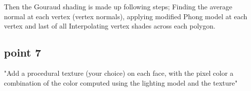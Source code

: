 \documentclass[12pt,a4paper]{article}
\begin{document}
Then the Gouraud shading is made up following steps; Finding the average normal at each vertex (vertex normals), applying modified Phong model at each vertex and last of all Interpolating vertex shades across each polygon.
\subsection{point 7}
"Add a procedural texture (your choice) on each face, with the pixel color a combination of the color
computed using the lighting model and the texture"


\end{document}
